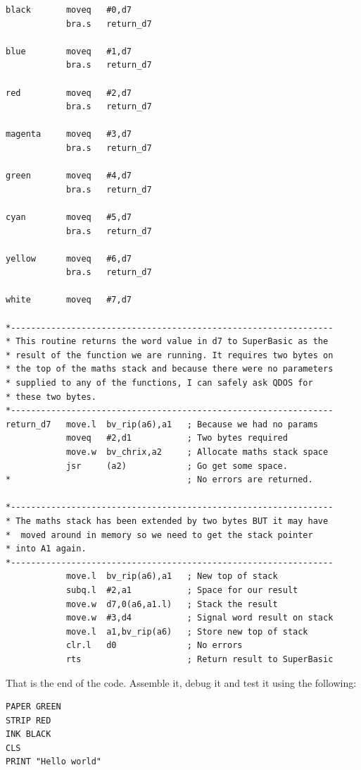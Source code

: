 \begin{lstlisting}[firstnumber=1,]
black       moveq   #0,d7
            bra.s   return_d7

blue        moveq   #1,d7
            bra.s   return_d7

red         moveq   #2,d7
            bra.s   return_d7

magenta     moveq   #3,d7
            bra.s   return_d7

green       moveq   #4,d7
            bra.s   return_d7

cyan        moveq   #5,d7
            bra.s   return_d7

yellow      moveq   #6,d7
            bra.s   return_d7

white       moveq   #7,d7

*----------------------------------------------------------------
* This routine returns the word value in d7 to SuperBasic as the 
* result of the function we are running. It requires two bytes on
* the top of the maths stack and because there were no parameters
* supplied to any of the functions, I can safely ask QDOS for 
* these two bytes.
*----------------------------------------------------------------
return_d7   move.l  bv_rip(a6),a1   ; Because we had no params
            moveq   #2,d1           ; Two bytes required
            move.w  bv_chrix,a2     ; Allocate maths stack space
            jsr     (a2)            ; Go get some space.
*                                   ; No errors are returned.

*----------------------------------------------------------------
* The maths stack has been extended by two bytes BUT it may have
*  moved around in memory so we need to get the stack pointer 
* into A1 again.
*----------------------------------------------------------------
            move.l  bv_rip(a6),a1   ; New top of stack
            subq.l  #2,a1           ; Space for our result
            move.w  d7,0(a6,a1.l)   ; Stack the result
            move.w  #3,d4           ; Signal word result on stack
            move.l  a1,bv_rip(a6)   ; Store new top of stack
            clr.l   d0              ; No errors
            rts                     ; Return result to SuperBasic
\end{lstlisting}

That is the end of the code. Assemble it, debug it and test it using
    the following:

\begin{lstlisting}[firstnumber=1,]
PAPER GREEN
STRIP RED
INK BLACK
CLS
PRINT "Hello world"
\end{lstlisting}

